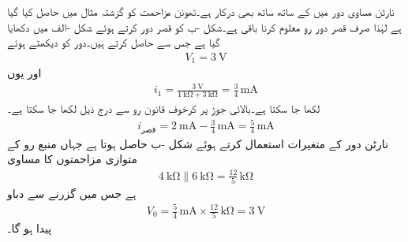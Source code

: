 نارٹن مساوی دور میں  کے ساتھ ساتھ  بھی درکار ہے۔تھونن مزاحمت کو گزشتہ مثال میں حاصل کیا گیا ہے لہٰذا صرف قصر دور رو معلوم کرنا باقی ہے۔شکل -ب کو قصر دور کرتے ہوئے شکل -الف میں دکھایا گیا ہے جس سے   حاصل کرتے ہیں۔دور کو دیکھتے ہوئے 
\begin{align*}
V_1=\SI{3}{\volt}
\end{align*}
اور یوں
\begin{align*}
i_1=\frac{\SI{3}{\volt}}{\SI{1}{\kilo\ohm}+\SI{3}{\kilo\ohm}}=\frac{3}{4} \, \si{\milli\ampere}
\end{align*}
لکھا جا سکتا ہے۔بالائی جوڑ  پر کرخوف قانون رو سے درج ذیل لکھا جا سکتا ہے۔
\begin{align*}
i_{\text{قصر}} = \SI{2}{\milli\ampere}-\frac{3}{4} \, \si{\milli\ampere}=\frac{5}{4} \, \si{\milli\ampere}
\end{align*}
نارٹن دور کے متغیرات  استعمال کرتے ہوئے شکل -ب حاصل ہوتا ہے جہاں منبع رو کے متوازی مزاحمتوں کا مساوی
\begin{align*}
\SI{4}{\kilo\ohm} \parallel \SI{6}{\kilo\ohm}=\frac{12}{5} \, \si{\kilo\ohm}
\end{align*}
ہے  جس میں  گزرنے سے دباو
\begin{align*}
V_0=\frac{5}{4} \, \si{\milli\ampere} \times \frac{12}{5} \, \si{\kilo\ohm}=\SI{3}{\volt}
\end{align*}
پیدا ہو گا۔

